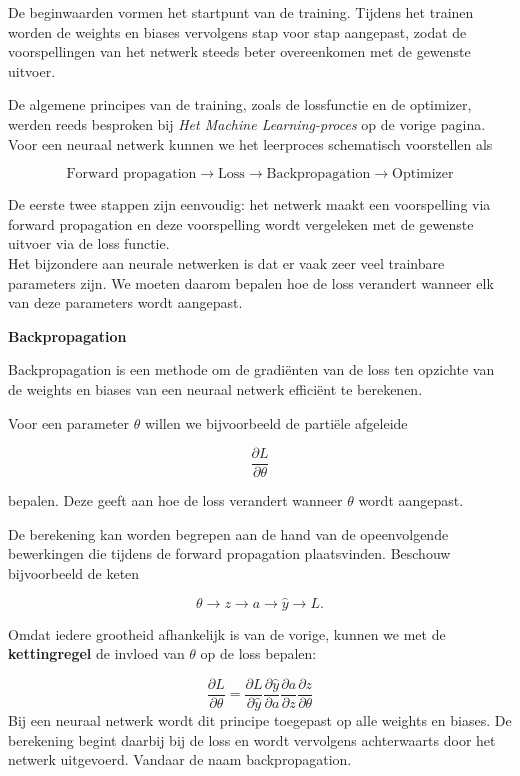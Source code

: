 \documentclass{ximera}
\begin{document}
De beginwaarden vormen het startpunt van de training. Tijdens het trainen worden de weights en biases vervolgens stap voor stap aangepast, zodat de voorspellingen van het netwerk steeds beter overeenkomen met de gewenste uitvoer.

De algemene principes van de training, zoals de lossfunctie en de optimizer, werden reeds besproken bij \textit{Het Machine Learning-proces} op de vorige pagina. Voor een neuraal netwerk kunnen we het leerproces schematisch voorstellen als

\[
\boxed{
\text{Forward propagation}
\rightarrow
\text{Loss}
\rightarrow
\text{Backpropagation}
\rightarrow
\text{Optimizer}
}
\]

De eerste twee stappen zijn eenvoudig: het netwerk maakt een voorspelling via forward propagation en deze voorspelling wordt vergeleken met de gewenste uitvoer via de loss functie. \\
Het bijzondere aan neurale netwerken is dat er vaak zeer veel trainbare parameters zijn. We moeten daarom bepalen hoe de loss verandert wanneer elk van deze parameters wordt aangepast.

\begin{definition} \textbf{Backpropagation}

Backpropagation is een methode om de gradiënten van de loss ten opzichte van de weights en biases van een neuraal netwerk efficiënt te berekenen.

Voor een parameter $\theta$ willen we bijvoorbeeld de partiële afgeleide

\[
\frac{\partial L}{\partial\theta}
\]

bepalen. Deze geeft aan hoe de loss verandert wanneer $\theta$ wordt aangepast.

De berekening kan worden begrepen aan de hand van de opeenvolgende
bewerkingen die tijdens de forward propagation plaatsvinden. Beschouw bijvoorbeeld de keten

\[
\theta \longrightarrow z \longrightarrow a
\longrightarrow \hat{y} \longrightarrow L.
\]

Omdat iedere grootheid afhankelijk is van de vorige, kunnen we met de \textbf{kettingregel} de invloed van $\theta$ op de loss bepalen:

\[
\boxed{
\frac{\partial L}{\partial\theta}
=
\frac{\partial L}{\partial\hat{y}}
\frac{\partial\hat{y}}{\partial a}
\frac{\partial a}{\partial z}
\frac{\partial z}{\partial\theta}
}
\]
Bij een neuraal netwerk wordt dit principe toegepast op alle weights en biases. De berekening begint daarbij bij de loss en wordt vervolgens achterwaarts door het netwerk uitgevoerd. Vandaar de naam backpropagation.
\end{definition} \text{ } \\
\end{document}
